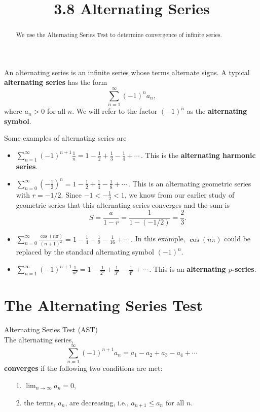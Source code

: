 \documentclass[handout]{ximera}
\title{3.8 Alternating Series}
\begin{document}
\begin{abstract}
We use the Alternating Series Test to determine convergence of infinite series.
\end{abstract}

\maketitle




An alternating series is an infinite series whose terms alternate signs.
A typical \textbf{alternating series} has the form 
\[
\sum_{n=1}^\infty (-1)^n a_n,
\]
where $a_n > 0$ for all $n$. We will refer to the factor $(-1)^n$ as the \textbf{alternating symbol}.

Some examples of alternating series are
\begin{itemize}

\item $\displaystyle{\sum_{n=1}^\infty (-1)^{n+1} \frac{1}{n} = 1 - \frac12 + \frac13 - \frac14 + \cdots  }\, .$  This is the \textbf{alternating harmonic series}.

\item $\displaystyle{\sum_{n=0}^\infty \left(-\frac12\right)^n = 1 - \frac12 + \frac14 - \frac18 + \cdots }\, .$  This is an alternating geometric series with $r=-1/2$.
Since $-1 < -\frac12 < 1$, we know from our earlier study of geometric series that this alternating series converges and 
the sum is 
\[
S = \frac{a}{1-r} = \frac{1}{1-(-1/2)} = \frac23.
\]

\item $\displaystyle{\sum_{n=0}^\infty \frac{\cos(n\pi)}{(n+1)^2} = 1 - \frac14 + \frac19 - \frac{1}{16} + \cdots}\, .$ 
In this example, $\cos(n\pi)$ could be replaced by the standard alternating symbol $(-1)^n$.


\item $\displaystyle{\sum_{n=1}^\infty (-1)^{n+1} \frac{1}{n^p} = 1 - \frac{1}{2^p} + \frac{1}{3^p} - \frac{1}{4^p} + \cdots  }\, .$  This is an \textbf{alternating $p$-series}.


\end{itemize}

\section{The Alternating Series Test}

\begin{theorem} Alternating Series Test (AST)\\
The alternating series, 
\[
\sum_{n=1}^\infty (-1)^{n+1} a_n = a_1 - a_2 + a_3 - a_4 + \cdots
\]
\textbf{converges} if the following two conditions are met:
\begin{itemize}
\item[1.] $\displaystyle{\lim_{n\to\infty} a_n = 0}$,
\item[2.] the terms, $a_n$, are decreasing, i.e., $a_{n+1} \leq a_n$ for all $n$.
\end{itemize}
\end{theorem}
\end{document}
